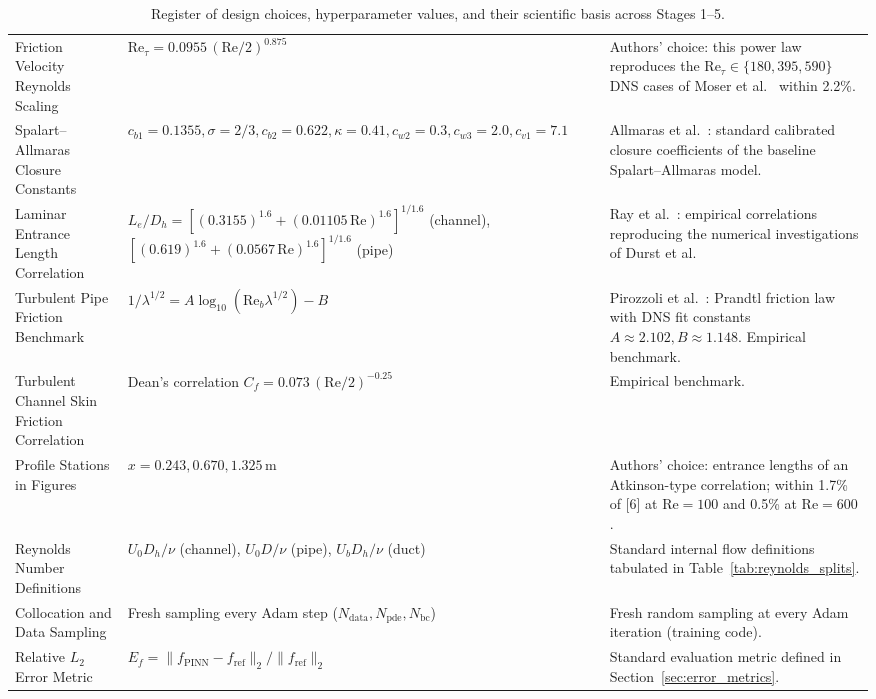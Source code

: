 \documentclass[11pt,a4paper]{article}
\begin{document}
\begin{table}[H]
{\begin{tabular}{lp{5.5cm}p{10.0cm}}
Friction Velocity Reynolds Scaling & $\mathrm{Re}_\tau = 0.0955\,(\mathrm{Re}/2)^{0.875}$ & Authors' choice: this power law reproduces the $\mathrm{Re}_\tau \in \{180, 395, 590\}$ DNS cases of Moser et al.~\cite{moser1999} within 2.2\%. \\
Spalart--Allmaras Closure Constants & $c_{b1}=0.1355, \sigma=2/3, c_{b2}=0.622, \kappa=0.41, c_{w2}=0.3, c_{w3}=2.0, c_{v1}=7.1$ & Allmaras et al.~\cite[Sec.~2.1, p.~2]{allmaras2012}: standard calibrated closure coefficients of the baseline Spalart--Allmaras model. \\
Laminar Entrance Length Correlation & $L_e/D_h = [(0.3155)^{1.6} + (0.01105\,\mathrm{Re})^{1.6}]^{1/1.6}$ (channel), $[(0.619)^{1.6} + (0.0567\,\mathrm{Re})^{1.6}]^{1/1.6}$ (pipe) & Ray et al.~\cite[Eqs.~(2a)--(2b), p.~8]{ray2017}: empirical correlations reproducing the numerical investigations of Durst et al. \\
Turbulent Pipe Friction Benchmark & $1/\lambda^{1/2} = A \log_{10}(\mathrm{Re}_b \lambda^{1/2}) - B$ & Pirozzoli et al.~\cite[Eq.~(3.2), p.~7]{pirozzoli2021}: Prandtl friction law with DNS fit constants $A \approx 2.102, B \approx 1.148$. Empirical benchmark. \\
Turbulent Channel Skin Friction Correlation & Dean's correlation $C_f = 0.073\,(\mathrm{Re}/2)^{-0.25}$ & Empirical benchmark. \\
Profile Stations in Figures & $x = 0.243, 0.670, 1.325\,\text{m}$ & Authors' choice: entrance lengths of an Atkinson-type correlation; within 1.7\% of [6] at $\mathrm{Re}=100$ and 0.5\% at $\mathrm{Re}=600$. \\
Reynolds Number Definitions & $U_0 D_h/\nu$ (channel), $U_0 D/\nu$ (pipe), $U_b D_h/\nu$ (duct) & Standard internal flow definitions tabulated in Table~\ref{tab:reynolds_splits}. \\
Collocation and Data Sampling & Fresh sampling every Adam step ($N_{\mathrm{data}}, N_{\mathrm{pde}}, N_{\mathrm{bc}}$) & Fresh random sampling at every Adam iteration (training code). \\
Relative $L_2$ Error Metric & $E_f = \|f_{\mathrm{PINN}} - f_{\mathrm{ref}}\|_2 / \|f_{\mathrm{ref}}\|_2$ & Standard evaluation metric defined in Section~\ref{sec:error_metrics}. \\
\bottomrule
\end{tabular}}
\caption{Register of design choices, hyperparameter values, and their scientific basis across Stages 1--5.}
\label{tab:design_choices_registry}
\end{table}
\end{document}
